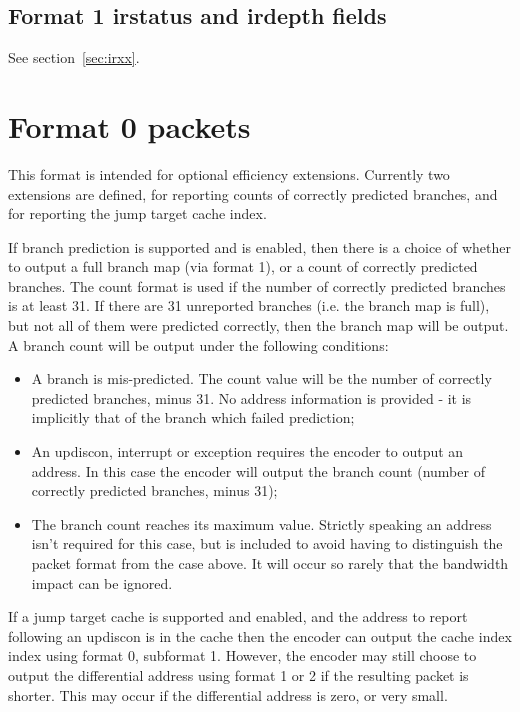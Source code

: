 \subsection{Format 1 \textbf{irstatus} and \textbf{irdepth} fields}

See section~\ref{sec:irxx}.

\FloatBarrier
\section{Format 0 packets} \label{sec:format0}

This format is intended for optional efficiency extensions.  Currently two extensions are defined, for reporting counts of
correctly predicted branches, and for reporting the jump target cache index.

If branch prediction is supported and is enabled, then there is a choice of whether to output a 
full branch map (via format 1), or a count of correctly predicted branches.  
The count format is used if the number of correctly predicted branches is at least 31.  If there are 31 unreported 
branches (i.e. the branch map is full), but not all of them were predicted correctly, then the branch map will be output.  
A branch count will be output under the following conditions:

\begin{itemize}
  \item A branch is mis-predicted.  The count value will be the number of correctly predicted branches, 
    minus 31.  No address information is provided - it is implicitly that of the branch which failed
    prediction;
  \item An updiscon, interrupt or exception requires the encoder to output an address.  In this case 
    the encoder will output the branch count (number of correctly predicted branches, minus 31);
  \item The branch count reaches its maximum value.  Strictly speaking an address isn't required for this case, 
    but is included to avoid having to distinguish the packet format from the case above.  It will occur so rarely 
    that the bandwidth impact can be ignored.
\end{itemize}

If a jump target cache is supported and enabled, and the address to report following an updiscon is
in the cache then the encoder can output the cache index index using format 0, subformat 1.  
However, the encoder may still choose to output the differential address using format 1 or 2 if the 
resulting packet is shorter.  This may occur if the differential address is zero, or very small.

